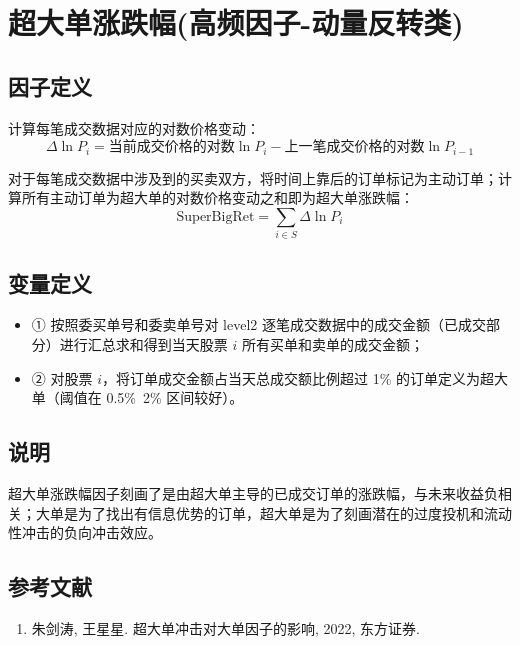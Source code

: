 \documentclass{article}
\begin{document}
\section{超大单涨跌幅(高频因子-动量反转类)}

\subsection{因子定义}

计算每笔成交数据对应的对数价格变动：
\begin{equation}
    \Delta \ln P_i = \text{当前成交价格的对数}\ln P_i - \text{上一笔成交价格的对数}\ln P_{i-1}
\end{equation}

对于每笔成交数据中涉及到的买卖双方，将时间上靠后的订单标记为主动订单；计算所有主动订单为超大单的对数价格变动之和即为超大单涨跌幅：
\begin{equation}
    \mathrm{SuperBigRet} = \sum_{i \in S} \Delta \ln P_i
\end{equation}

\subsection{变量定义}
\begin{itemize}
    \item ① 按照委买单号和委卖单号对 level2 逐笔成交数据中的成交金额（已成交部分）进行汇总求和得到当天股票 \( i \) 所有买单和卖单的成交金额；
    \item ② 对股票 \( i \)，将订单成交金额占当天总成交额比例超过 1\% 的订单定义为超大单（阈值在 0.5\%~2\% 区间较好）。
\end{itemize}

\subsection{说明}
超大单涨跌幅因子刻画了是由超大单主导的已成交订单的涨跌幅，与未来收益负相关；大单是为了找出有信息优势的订单，超大单是为了刻画潜在的过度投机和流动性冲击的负向冲击效应。

\subsection{参考文献}
\begin{enumerate}
    \item 朱剑涛, 王星星. 超大单冲击对大单因子的影响, 2022, 东方证券.
\end{enumerate}
\end{document}
